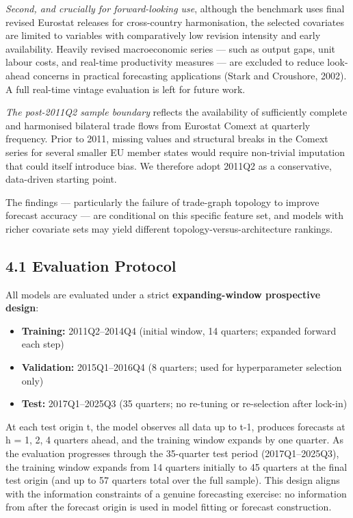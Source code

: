 \documentclass[
]{article}
\providecommand{\tightlist}{%
  \setlength{\itemsep}{0pt}\setlength{\parskip}{0pt}}
\begin{document}
\emph{Second, and crucially for forward-looking use}, although the benchmark uses final revised Eurostat releases for cross-country harmonisation, the selected covariates are limited to variables with comparatively low revision intensity and early availability. Heavily revised macroeconomic series --- such as output gaps, unit labour costs, and real-time productivity measures --- are excluded to reduce look-ahead concerns in practical forecasting applications (Stark and Croushore, 2002). A full real-time vintage evaluation is left for future work.

\emph{The post-2011Q2 sample boundary} reflects the availability of sufficiently complete and harmonised bilateral trade flows from Eurostat Comext at quarterly frequency. Prior to 2011, missing values and structural breaks in the Comext series for several smaller EU member states would require non-trivial imputation that could itself introduce bias. We therefore adopt 2011Q2 as a conservative, data-driven starting point.

The findings --- particularly the failure of trade-graph topology to improve forecast accuracy --- are conditional on this specific feature set, and models with richer covariate sets may yield different topology-versus-architecture rankings.

\subsection{4.1 Evaluation Protocol}\label{evaluation-protocol}

All models are evaluated under a strict \textbf{expanding-window
prospective design}:

\begin{itemize}
\tightlist
\item
  \textbf{Training:} 2011Q2--2014Q4 (initial window, 14 quarters;
  expanded forward each step)
\item
  \textbf{Validation:} 2015Q1--2016Q4 (8 quarters; used for
  hyperparameter selection only)
\item
  \textbf{Test:} 2017Q1--2025Q3 (35 quarters; no re-tuning or
  re-selection after lock-in)
\end{itemize}

At each test origin t, the model observes all data up to t-1, produces
forecasts at h = 1, 2, 4 quarters ahead, and the training window expands
by one quarter. As the evaluation progresses through the 35-quarter test period (2017Q1--2025Q3), the training window expands from 14 quarters initially to 45 quarters at the final test origin (and up to 57 quarters total over the full sample). This design aligns with the information constraints of a
genuine forecasting exercise: no information from after the forecast origin
is used in model fitting or forecast construction.
\end{document}
